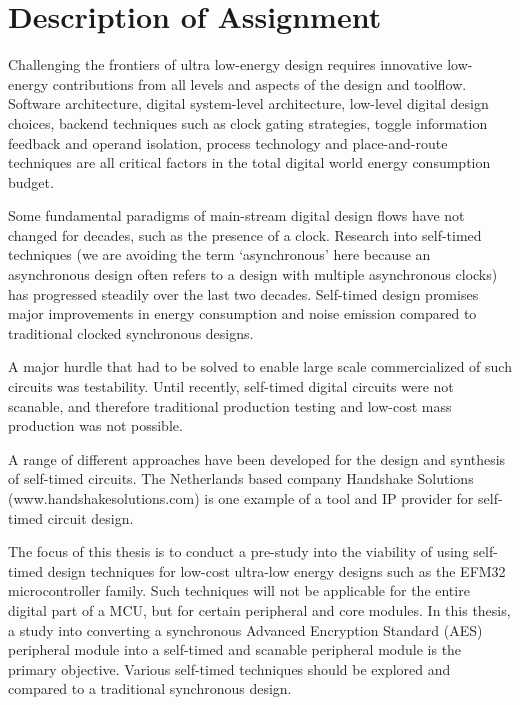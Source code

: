 \section*{Description of Assignment}

Challenging the frontiers of ultra low-energy design requires
innovative low-energy contributions from all levels and aspects of the
design and toolflow. Software architecture, digital system-level
architecture, low-level digital design choices, backend techniques
such as clock gating strategies, toggle information feedback and
operand isolation, process technology and place-and-route techniques
are all critical factors in the total digital world energy consumption
budget.

Some fundamental paradigms of main-stream digital design flows have
not changed for decades, such as the presence of a clock. Research
into self-timed techniques (we are avoiding the term ‘asynchronous’
here because an asynchronous design often refers to a design with
multiple asynchronous clocks) has progressed steadily over the last
two decades. Self-timed design promises major improvements in energy
consumption and noise emission compared to traditional clocked
synchronous designs.

A major hurdle that had to be solved to enable large scale
commercialized of such circuits was testability. Until recently,
self-timed digital circuits were not scanable, and therefore
traditional production testing and low-cost mass production was not
possible.

A range of different approaches have been developed for the design and
synthesis of self-timed circuits. The Netherlands based company
Handshake Solutions (www.handshakesolutions.com) is one example of a
tool and IP provider for self-timed circuit design.

The focus of this thesis is to conduct a pre-study into the viability
of using self-timed design techniques for low-cost ultra-low energy
designs such as the EFM32 microcontroller family. Such techniques will
not be applicable for the entire digital part of a MCU, but for
certain peripheral and core modules. In this thesis, a study into
converting a synchronous Advanced Encryption Standard (AES) peripheral
module into a self-timed and scanable peripheral module is the primary
objective. Various self-timed techniques should be explored and
compared to a traditional synchronous design.
